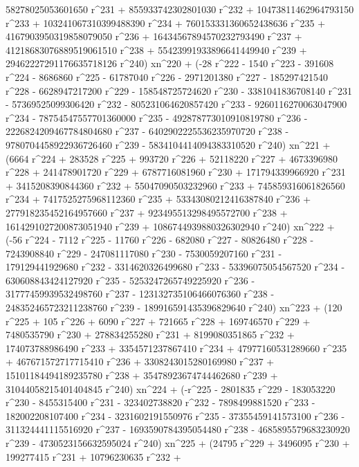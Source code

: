        58278025053601650 r^231 + 855933742302801030 r^232 + 
       10473811462964793150 r^233 + 103241067310399488390 r^234 + 
       760153331360652438636 r^235 + 4167903950319858079050 r^236 + 
       16434567894570232793490 r^237 + 
       41218683076889519061510 r^238 + 
       55423991933896641449940 r^239 + 
       29462227291176635718126 r^240) xn^220 + (-28 r^222 - 
       1540 r^223 - 391608 r^224 - 8686860 r^225 - 61787040 r^226 - 
       2971201380 r^227 - 185297421540 r^228 - 6628947217200 r^229 - 
       158548725724620 r^230 - 3381041836708140 r^231 - 
       57369525099306420 r^232 - 805231064620857420 r^233 - 
       9260116270063047900 r^234 - 78754547557701360000 r^235 - 
       492878773010910819780 r^236 - 2226824209467784804680 r^237 - 
       6402902225536235970720 r^238 - 9780704458922936726460 r^239 - 
       5834104414094383310520 r^240) xn^221 + (6664 r^224 + 
       283528 r^225 + 993720 r^226 + 52118220 r^227 + 
       4673396980 r^228 + 241478901720 r^229 + 6787716081960 r^230 + 
       171794339966920 r^231 + 3415208390844360 r^232 + 
       55047090503232960 r^233 + 745859316061826560 r^234 + 
       7417525275968112360 r^235 + 53343080212416387840 r^236 + 
       277918235452164957660 r^237 + 923495513298495572700 r^238 + 
       1614291027200873051940 r^239 + 
       1086744939880326302940 r^240) xn^222 + (-56 r^224 - 
       7112 r^225 - 11760 r^226 - 682080 r^227 - 80826480 r^228 - 
       7243908840 r^229 - 247081117080 r^230 - 7530059207160 r^231 - 
       179129441929680 r^232 - 3314620326499680 r^233 - 
       53396075054567520 r^234 - 630608843424127920 r^235 - 
       5253247265749225920 r^236 - 31777459939532498760 r^237 - 
       123132735106466076360 r^238 - 248352465723211238760 r^239 - 
       189916591435396829640 r^240) xn^223 + (120 r^225 + 105 r^226 + 
       6090 r^227 + 721665 r^228 + 169746570 r^229 + 
       7480535790 r^230 + 278834255280 r^231 + 8199080351865 r^232 + 
       174073788986490 r^233 + 3354571237867410 r^234 + 
       47977160531289660 r^235 + 467671572717715410 r^236 + 
       3308243015280169980 r^237 + 15101184494189235780 r^238 + 
       35478923674744462680 r^239 + 
       31044058215401404845 r^240) xn^224 + (-r^225 - 2801835 r^229 - 
       183053220 r^230 - 8455315400 r^231 - 323402738820 r^232 - 
       7898499881520 r^233 - 182002208107400 r^234 - 
       3231602191550976 r^235 - 37355459141573100 r^236 - 
       311324441115516920 r^237 - 1693590784395054480 r^238 - 
       4685895579683230920 r^239 - 
       4730523156632595024 r^240) xn^225 + (24795 r^229 + 
       3496095 r^230 + 199277415 r^231 + 10796230635 r^232 + 
